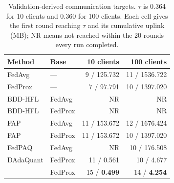 \begin{table}[!t]
\centering\small
\caption{Validation-derived communication targets. $\tau$ is 0.364 for 10 clients and 0.360 for 100 clients. Each cell gives the first round reaching $\tau$ and its cumulative uplink (MB); NR means not reached within the 20 rounds every run completed.}
\label{tab:targets}
\begin{tabular}{llrr}
\toprule
Method & Base & 10 clients & 100 clients \\
\midrule
FedAvg & --- & 9 / 125.732 & 11 / 1536.722 \\
FedProx & --- & 7 / 97.791 & 10 / 1397.020 \\
BDD-HFL & FedAvg & NR & NR \\
BDD-HFL & FedProx & NR & NR \\
FAP & FedAvg & 11 / 153.672 & 12 / 1676.424 \\
FAP & FedProx & 11 / 153.672 & 10 / 1397.020 \\
FedPAQ & FedAvg & NR & 10 / 176.508 \\
DAdaQuant & FedProx & 11 / 0.561 & 10 / 4.677 \\
\method{} & FedProx & 15 / \textbf{0.499} & 14 / \textbf{4.254} \\
\bottomrule
\end{tabular}
\end{table}
